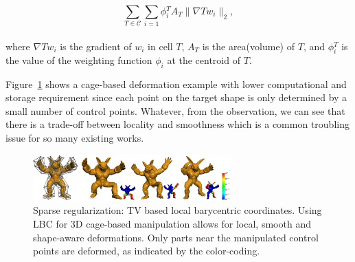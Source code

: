 \small{
\begin{equation}
 \label{eq:discreteLBC}
 \sum_{T\in\mathcal{C}}^{}  \sum_{i=1}^{}
 \phi{_{i}^{T}}  A_{T}  \| \nabla T w_{i} \|_2,
\end{equation}
}
\\
where $\nabla T w_{i}$ is the gradient of $w_{i}$ in cell $T$, $A_{T}$ is the area(volume) of $T$, and $\phi{_{i}^{T}}$ is the value of the weighting function $\phi_{i}$ at the centroid of $T$.

Figure~\ref{fig:LBC} shows a cage-based deformation example with lower computational and storage requirement since each point on the target shape is only determined by a small number of control points.
Whatever, from the observation, we can see that there is a trade-off between locality and smoothness which is a common troubling issue for so many existing works.

\begin{figure}[ht]
  \centering
  \includegraphics[width=3in]{images/LBC_L1}
  \caption{Sparse regularization: TV based local barycentric coordinates\cite{zhang2014local}. Using LBC for 3D cage-based manipulation allows for local, smooth and shape-aware deformations. Only parts near the manipulated control points are deformed, as indicated by the color-coding.}
  \label{fig:LBC}
\end{figure}
